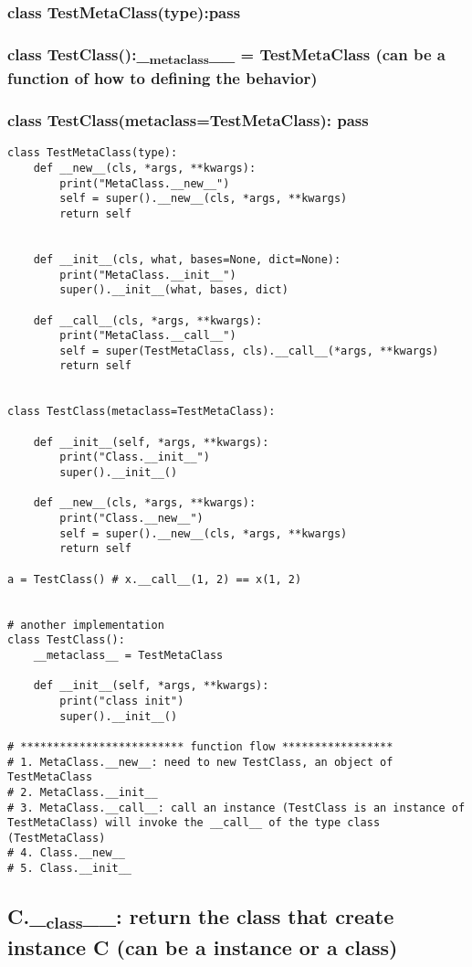 \documentclass[11pt]{article}
\begin{document}
\subsubsection{class TestMetaClass(type):pass}
\label{sec:orged72848}
\subsubsection{class TestClass():\_\textsubscript{metaclass}\_\_ = TestMetaClass (can be a function of how to defining the behavior)}
\label{sec:orgf34ccf4}
\subsubsection{class TestClass(metaclass=TestMetaClass): pass}
\label{sec:org9ad3c4b}
\begin{verbatim}
class TestMetaClass(type):
    def __new__(cls, *args, **kwargs):
        print("MetaClass.__new__")
        self = super().__new__(cls, *args, **kwargs)
        return self


    def __init__(cls, what, bases=None, dict=None):
        print("MetaClass.__init__")
        super().__init__(what, bases, dict)

    def __call__(cls, *args, **kwargs):
        print("MetaClass.__call__")
        self = super(TestMetaClass, cls).__call__(*args, **kwargs)
        return self 


class TestClass(metaclass=TestMetaClass):

    def __init__(self, *args, **kwargs):
        print("Class.__init__")
        super().__init__()

    def __new__(cls, *args, **kwargs):
        print("Class.__new__")
        self = super().__new__(cls, *args, **kwargs)
        return self

a = TestClass() # x.__call__(1, 2) == x(1, 2)


# another implementation
class TestClass():
    __metaclass__ = TestMetaClass

    def __init__(self, *args, **kwargs):
        print("class init")
        super().__init__()

# ************************* function flow *****************
# 1. MetaClass.__new__: need to new TestClass, an object of TestMetaClass 
# 2. MetaClass.__init__
# 3. MetaClass.__call__: call an instance (TestClass is an instance of TestMetaClass) will invoke the __call__ of the type class (TestMetaClass)
# 4. Class.__new__
# 5. Class.__init__
\end{verbatim}
\subsection{C.\_\textsubscript{class}\_\_: return the class that create instance C (can be a instance or a class)}
\label{sec:org7a9da63}
\end{document}
